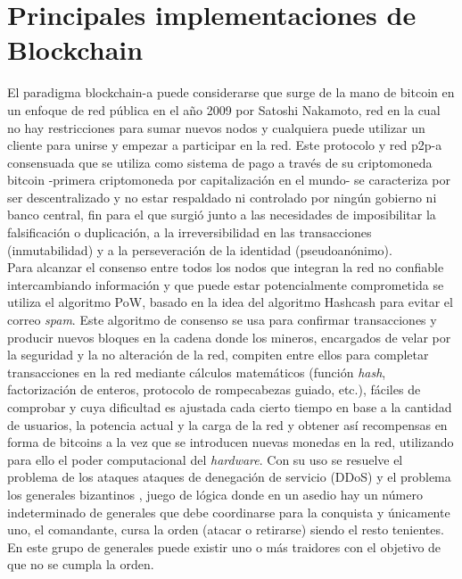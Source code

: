 \documentclass[12pt,a4paper, twoside]{report}
\begin{document}
	\section{Principales implementaciones de Blockchain}
	
	El paradigma \gls{blockchain-a} puede considerarse que surge de la mano de \gls{bitcoin} en un enfoque de red pública en el año 2009 por Satoshi Nakamoto, red en la cual no hay restricciones para sumar nuevos nodos y cualquiera puede utilizar un cliente para unirse y empezar a participar en la red. Este protocolo y red \gls{p2p-a} consensuada que se utiliza como sistema de pago a través de su criptomoneda bitcoin -primera criptomoneda por capitalización en el mundo- se caracteriza por ser descentralizado y no estar respaldado ni controlado por ningún gobierno ni banco central, fin para el que surgió junto a las necesidades de imposibilitar la falsificación o duplicación, a la irreversibilidad en las transacciones (inmutabilidad) y a la perseveración de la identidad (pseudoanónimo). \\
	
	Para alcanzar el consenso entre todos los nodos que integran la red no confiable intercambiando información y que puede estar potencialmente comprometida se utiliza el algoritmo PoW, basado en la idea del algoritmo Hashcash \cite{hashcash} para evitar el correo \textit{spam}. Este algoritmo de consenso se usa para confirmar transacciones y producir nuevos bloques en la cadena donde los mineros, encargados de velar por la seguridad y la no alteración de la red, compiten entre ellos para completar transacciones en la red mediante cálculos matemáticos (función \textit{hash}, factorización de enteros, protocolo de rompecabezas guiado, etc.), fáciles de comprobar y cuya dificultad es ajustada cada cierto tiempo en base a la cantidad de usuarios, la potencia actual y la carga de la red y obtener así recompensas en forma de bitcoins a la vez que se introducen nuevas monedas en la red, utilizando para ello el poder computacional del \textit{hardware}. Con su uso se resuelve el problema de los ataques ataques de denegación de servicio (DDoS) y el problema los generales bizantinos \cite{bizantinos:2014}, juego de lógica donde en un asedio hay un número indeterminado de generales que debe coordinarse para la conquista y únicamente uno, el comandante, cursa la orden (atacar o retirarse) siendo el resto tenientes. En este grupo de generales puede existir uno o más traidores  con el objetivo de que no se cumpla la orden. \\
	
\end{document}
